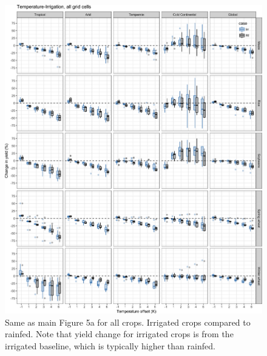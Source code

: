 \documentclass[10pt]{article}
\begin{document}
\begin{figure}[h!]
\centering
\includegraphics[width=\textwidth]{s_sim_CG_T_irr.png}
\caption{Same as main Figure 5a for all crops. Irrigated crops compared to rainfed. Note that yield change for irrigated crops is from the irrigated baseline, which is typically higher than rainfed.}
\label{fig:temp_irr}
\end{figure}
\end{document}
